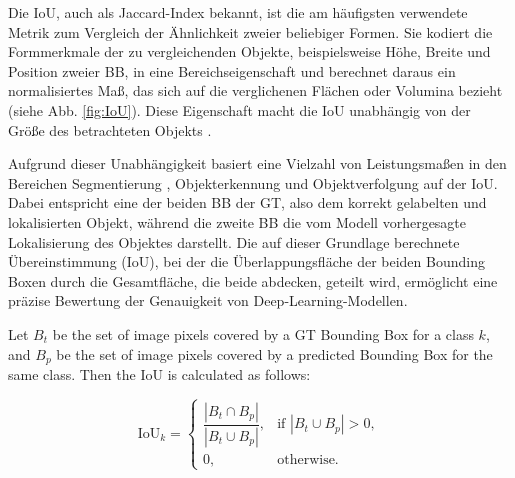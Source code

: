 Die \acrfull{IoU}, auch als Jaccard-Index bekannt, ist die am häufigsten verwendete Metrik zum Vergleich der Ähnlichkeit zweier beliebiger Formen. Sie kodiert die Formmerkmale der zu vergleichenden Objekte, beispielsweise Höhe, Breite und Position zweier \acrfull{BB}, in eine Bereichseigenschaft und berechnet daraus ein normalisiertes Maß, das sich auf die verglichenen Flächen oder Volumina bezieht (siehe Abb. \ref{fig:IoU}). Diese Eigenschaft macht die \acrshort{IoU} unabhängig von der Größe des betrachteten Objekts \cite{Rezatofighi2019}.

Aufgrund dieser Unabhängigkeit basiert eine Vielzahl von Leistungsmaßen in den Bereichen Segmentierung \cite{Ramirez2019,cordts2016,Zhou2017,lin2015}, Objekterkennung \cite{lin2015,Everingham2010} und Objektverfolgung \cite{Kristan2016,lealtaixé2015} auf der \acrshort{IoU}. Dabei entspricht eine der beiden \acrshort{BB} der \acrfull{GT}, also dem korrekt gelabelten und lokalisierten Objekt, während die zweite \acrshort{BB} die vom Modell vorhergesagte Lokalisierung des Objektes darstellt. Die auf dieser Grundlage berechnete Übereinstimmung (\acrshort{IoU}), bei der die Überlappungsfläche der beiden Bounding Boxen durch die Gesamtfläche, die beide abdecken, geteilt wird, ermöglicht eine präzise Bewertung der Genauigkeit von Deep-Learning-Modellen.
\begin{definition}
    Let $B_t$ be the set of image pixels covered by a \acrlong{GT} Bounding Box for a class $k$, 
    and $B_p$ be the set of image pixels covered by a predicted Bounding Box for the same class. 
    Then the IoU is calculated as follows:

    \begin{equation}
    \text{IoU}_k =
    \begin{cases}
        \dfrac{|B_t \cap B_p|}{|B_t \cup B_p|}, & \text{if } |B_t \cup B_p| > 0, \\[6pt]
        0, & \text{otherwise.}
    \end{cases}
    \end{equation}

\end{definition}

